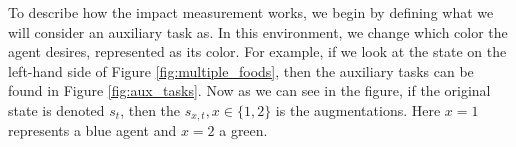 \documentclass[12pt,A4]{report}
\theoremstyle{definition}
\begin{document}

To describe how the impact measurement works, we begin by defining what we will consider an auxiliary task as. In this environment, we change which color the agent desires, represented as its color. For example, if we look at the state on the left-hand side of Figure \ref{fig:multiple_foods}, then the auxiliary tasks can be found in Figure \ref{fig:aux_tasks}. Now as we can see in the figure, if the original state is denoted $s_t$, then the $s_{x,t}, x \in \{1, 2\}$ is the augmentations. Here $x=1$ represents a blue agent and $x=2$ a green. 
\end{document}
